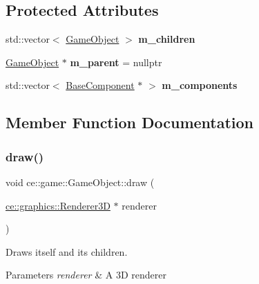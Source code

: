 \subsection*{Protected Attributes}
\begin{DoxyCompactItemize}
\item 
\mbox{\label{classce_1_1game_1_1_game_object_aaf7f530f3f33f9de4d688e5680ecb89b}} 
std\+::vector$<$ \hyperlink{classce_1_1game_1_1_game_object}{Game\+Object} $>$ {\bfseries m\+\_\+children}
\item 
\mbox{\label{classce_1_1game_1_1_game_object_a93aa7c45a4e23b65ebbb3aa3d79d34a6}} 
\hyperlink{classce_1_1game_1_1_game_object}{Game\+Object} $\ast$ {\bfseries m\+\_\+parent} = nullptr
\item 
\mbox{\label{classce_1_1game_1_1_game_object_a43334ef901188cf677db3be5bcad6766}} 
std\+::vector$<$ \hyperlink{classce_1_1game_1_1_base_component}{Base\+Component} $\ast$ $>$ {\bfseries m\+\_\+components}
\end{DoxyCompactItemize}


\subsection{Member Function Documentation}
\mbox{\label{classce_1_1game_1_1_game_object_ad5e81a50f4472e7557ec949eb3cc9413}} 
\subsubsection{\texorpdfstring{draw()}{draw()}}
{\footnotesize\ttfamily void ce\+::game\+::\+Game\+Object\+::draw (\begin{DoxyParamCaption}\item[{\hyperlink{classce_1_1graphics_1_1_renderer3_d}{ce\+::graphics\+::\+Renderer3D} $\ast$}]{renderer }\end{DoxyParamCaption})}



Draws itself and its children. 


\begin{DoxyParams}{Parameters}
{\em renderer} & A 3D renderer \\
\hline
\end{DoxyParams}
\mbox{\label{classce_1_1game_1_1_game_object_a2fcc1608d7c352ba88a5fcc5d99eb5e2}} 
